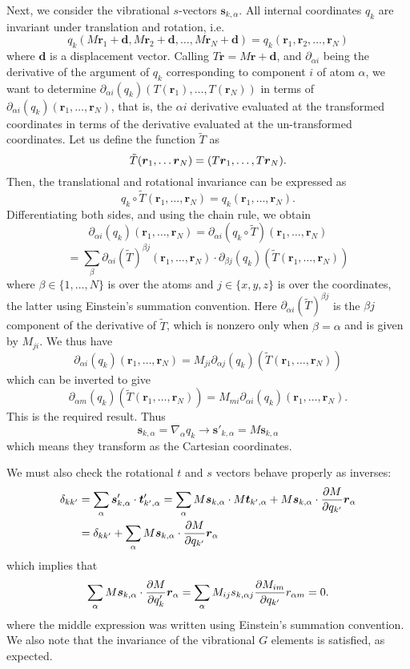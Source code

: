 \documentclass{article}
\newcommand{\vect}[1]{\boldsymbol{#1}}
\begin{document}
Next, we consider the vibrational $s$-vectors $\vect{s}_{k, \alpha}$. All internal coordinates $q_k$ are invariant under translation and rotation, i.e.
\[
q_k(M\vect{r}_1 + \vect{d}, M\vect{r}_2 + \vect{d}, \ldots, M\vect{r}_N + \vect{d}) = q_k(\vect{r}_1, \vect{r}_2, \ldots, \vect{r}_N)
\]
where $\vect{d}$ is a displacement vector. Calling $T\vect{r} = M\vect{r} + \vect{d}$, and $\partial_{\alpha i}$ being the derivative of the argument of $q_k$ corresponding to component $i$ of atom $\alpha$, we want to determine $\partial_{\alpha i}(q_k)(T(\vect{r}_1), \ldots, T(\vect{r}_N))$ in terms of $\partial_{\alpha i}(q_k)(\vect{r}_1, \ldots, \vect{r}_N)$, that is, the $\alpha i$ derivative evaluated at the transformed coordinates in terms of the derivative evaluated at the un-transformed coordinates. Let us define the function $\tilde{T}$ as
\[
\Tilde{T}(\vect{r}_1, \ldots \vect{r}_N) = (T\vect{r}_1, \ldots, T\vect{r}_N).
\]
Then, the translational and rotational invariance can be expressed as 
\[
q_k \circ \tilde{T}(\vect{r}_1, \ldots, \vect{r}_N) = q_k(\vect{r}_1, \ldots, \vect{r}_N).
\]
Differentiating both sides, and using the chain rule, we obtain
\[
\partial_{\alpha i}(q_k)(\vect{r}_1, \ldots, \vect{r}_N) =\partial_{\alpha i} (q_k \circ \tilde{T})(\vect{r}_1, \ldots, \vect{r}_N) 
\]
\[
= \sum_{\beta} \partial_{\alpha i}(\tilde{T})^{\beta j}(\vect{r}_1, \ldots, \vect{r}_N)\cdot 
\partial_{\beta j}(q_k)(\tilde{T}(\vect{r}_1, \ldots, \vect{r}_N))
\]
where $\beta \in \{1, \ldots, N\}$ is over the atoms and $j \in \{x, y, z\}$ is over the coordinates, the latter using Einstein's summation convention. Here $\partial_{\alpha i}(\tilde{T})^{\beta j}$ is the $\beta j$ component of the derivative of $\tilde{T}$, which is nonzero only when $\beta =\alpha$ and is given by $M_{ji}$. We thus have 
\[
\partial_{\alpha i}(q_k)(\vect{r}_1, \ldots, \vect{r}_N) =  M_{ji}\partial_{\alpha j}(q_k)(\tilde{T}(\vect{r}_1, \ldots, \vect{r}_N))
\]
which can be inverted to give
\[
\partial_{\alpha m}(q_k)(\tilde{T}(\vect{r}_1, \ldots, \vect{r}_N)) = M_{mi}\partial_{\alpha i}(q_k)(\vect{r}_1, \ldots, \vect{r}_N).
\]
This is the required result. Thus
\[
\vect{s}_{k, \alpha} = \nabla_{\alpha}q_k \to \vect{s}'_{k, \alpha} = M\vect{s}_{k, \alpha}
\]
which means they transform as the Cartesian coordinates. 

We must also check the rotational $t$ and $s$ vectors behave properly as inverses:
\[
\begin{split}
\delta_{kk'} &= \sum_{\alpha} \vect{s}'_{k, \alpha}\cdot \vect{t}'_{k', \alpha} = \sum_{\alpha}  M\vect{s}_{k, \alpha}\cdot M\vect{t}_{k', \alpha} +  M\vect{s}_{k, \alpha}\cdot \pdv{M}{q_{k'}}\vect{r}_\alpha \\ &= \delta_{kk'} + \sum_{\alpha}  M\vect{s}_{k, \alpha}\cdot \pdv{M}{q_{k'}}\vect{r}_\alpha \\
\end{split}
\]
which implies that
\[
\sum_{\alpha}  M\vect{s}_{k, \alpha}\cdot \pdv{M}{q_k'}\vect{r}_\alpha  =\sum_{\alpha} M_{ij} s_{k, \alpha j}\pdv{M_{im}}{q_{k'}}r_{ \alpha m}= 0.
\]
where the middle expression was written using Einstein's summation convention. We also note that the invariance of the vibrational $G$ elements is satisfied, as expected. 
\end{document}
